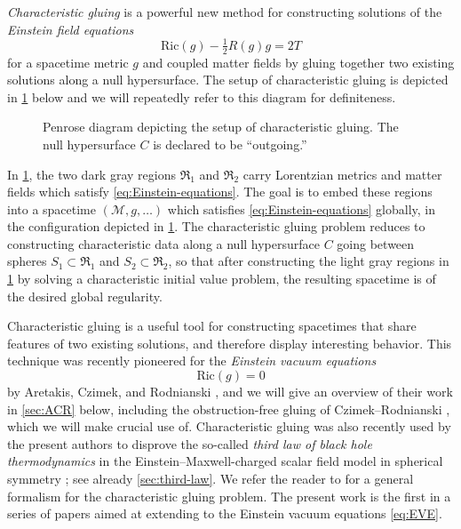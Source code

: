 \documentclass[10pt]{article}
\numberwithin{equation}{section}
\theoremstyle{plain}
\theoremstyle{definition}
\newcommand{\Ric}{\mathrm{Ric}}
\begin{document}
\emph{Characteristic gluing} is a powerful new method for constructing solutions of the \emph{Einstein field equations}
\begin{equation} \label{eq:Einstein-equations}
    \Ric(g) - \tfrac 12   R(g) g =   2 T
\end{equation} for a spacetime metric $g$ and coupled matter fields 
by gluing together two existing solutions along a null hypersurface. The setup of characteristic gluing is depicted in \cref{fig:char-gluing-setup} below and we will repeatedly refer to this diagram for definiteness. 

\begin{figure}[ht]
\centering{
\def\svgwidth{10pc}
}
\caption{Penrose diagram depicting the setup of characteristic gluing. The null hypersurface $C$ is declared to be ``outgoing.''}
\label{fig:char-gluing-setup}
\end{figure}

In \cref{fig:char-gluing-setup}, the two dark gray regions $\mathfrak R_1$ and $\mathfrak R_2$ carry Lorentzian metrics and matter fields which satisfy  \eqref{eq:Einstein-equations}. The goal is to embed these regions into a spacetime $(\mathcal M,g,\dotsc)$ which satisfies \eqref{eq:Einstein-equations} globally, in the configuration depicted in \cref{fig:char-gluing-setup}. The characteristic gluing problem reduces to constructing characteristic data along a null hypersurface $C$ going between spheres $S_1\subset\mathfrak R_1$ and $S_2\subset\mathfrak R_2$, so that after constructing the light gray regions in \cref{fig:char-gluing-setup} by solving a characteristic initial value problem, the resulting spacetime is of the desired global regularity. 

Characteristic gluing is a useful tool for constructing spacetimes that share features of two existing solutions, and therefore display interesting behavior. This technique was recently pioneered for the \emph{Einstein vacuum equations}
\begin{equation}
\Ric(g)=0\label{eq:EVE}
\end{equation}
by Aretakis, Czimek, and Rodnianski \cite{ACR1}, and we will give an overview of their work in \cref{sec:ACR} below, including the obstruction-free gluing of Czimek--Rodnianski \cite{Czimek2022-cl}, which we will make crucial use of. Characteristic gluing was also recently used by the present authors to disprove the so-called \emph{third law of black hole thermodynamics} in the Einstein--Maxwell-charged scalar field model in spherical symmetry \cite{KU22}; see already \cref{sec:third-law}. We refer the reader to \cite{KU22} for a general formalism for the characteristic gluing problem. The present work is the first in a series of papers aimed at extending \cite{KU22} to the Einstein vacuum equations \eqref{eq:EVE}.
\end{document}
